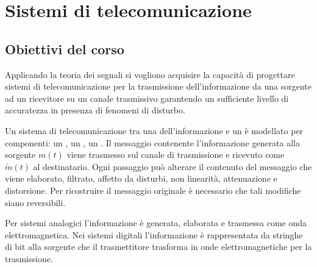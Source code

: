 \chapter{Sistemi di telecomunicazione}\label{sec:sistemi-di-telecomunicazione}

\section{Obiettivi del corso}

Applicando la teoria dei segnali si vogliono acquisire la capacità di progettare sistemi di telecomunicazione per la trasmissione dell'informazione da una sorgente ad un ricevitore su un canale trasmissivo garantendo un sufficiente livello di accuratezza in presenza di fenomeni di disturbo.

Un sistema di telecomunicazione tra una  dell'informazione e un  è modellato per componenti: un , un , un . Il messaggio contenente l'informazione generata alla sorgente $m(t)$ viene trasmesso sul canale di trasmissione e ricevuto come $\tilde{m}(t)$ al destinatario. Ogni passaggio può alterare il contenuto del messaggio che viene elaborato, filtrato, affetto da disturbi, non linearità, attenuazione e distorsione. Per ricostruire il messaggio originale è necessario che tali modifiche siano reversibili.

Per sistemi analogici l'informazione è generata, elaborata e trasmessa come onda elettromagnetica. Nei sistemi digitali l'informazione è rappresentata da stringhe di bit alla sorgente che il trasmettitore trasforma in onde elettromagnetiche per la trasmissione.

